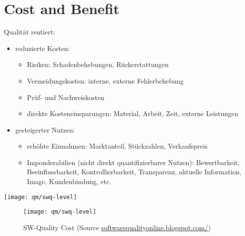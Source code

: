 \section{Cost and Benefit}
Qualität rentiert:
\begin{itemize}
\item reduzierte Kosten:
\begin{itemize}
  \item Risiken: Schadenbehebungen, Rückerstattungen
  \item Vermeidungskosten: interne, externe Fehlerbehebung
  \item Prüf- und Nachweiskosten
  \item direkte Kosteneinsparungen: Material, Arbeit, Zeit, externe Leistungen
\end{itemize}

\item  gesteigerter Nutzen:
  \begin{itemize}
  \item erhöhte Einnahmen: Marktanteil, Stückzahlen, Verkaufspreis
%
\item Imponderabilien (nicht direkt quantifizierbarer Nutzen):
  Bewertbarkeit, Beeinflussbarkeit, Kontrollierbarkeit,
  Transparenz, aktuelle Information, Image,
        Kundenbindung, etc.
      \end{itemize}
  \end{itemize}
\ifslides
\newslide
\texttt{[image: qm/swq-level]}
\else
\begin{figure}[H]
\begin{center}
\texttt{[image: qm/swq-level]}
\end{center}
\caption{SW-Quality Cost (Source
  \href{http://softwarequalityonline.blogspot.com/}
  {softwarequalityonline.blogspot.com/})}
\end{figure}
\fi
%
\newpage
